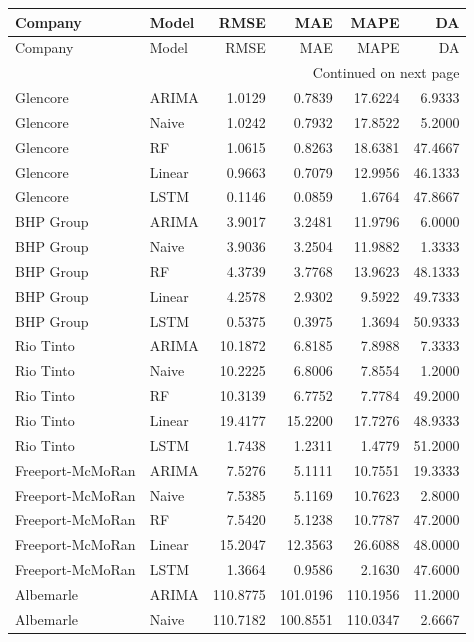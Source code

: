 \begin{longtable}{llrrrr}
\toprule
Company & Model & RMSE & MAE & MAPE & DA \\
\midrule
\endfirsthead
\toprule
Company & Model & RMSE & MAE & MAPE & DA \\
\midrule
\endhead
\midrule
\multicolumn{6}{r}{Continued on next page} \\
\midrule
\endfoot
\bottomrule
\endlastfoot
Glencore & ARIMA & 1.0129 & 0.7839 & 17.6224 & 6.9333 \\
Glencore & Naive & 1.0242 & 0.7932 & 17.8522 & 5.2000 \\
Glencore & RF & 1.0615 & 0.8263 & 18.6381 & 47.4667 \\
Glencore & Linear & 0.9663 & 0.7079 & 12.9956 & 46.1333 \\
Glencore & LSTM & 0.1146 & 0.0859 & 1.6764 & 47.8667 \\
BHP Group & ARIMA & 3.9017 & 3.2481 & 11.9796 & 6.0000 \\
BHP Group & Naive & 3.9036 & 3.2504 & 11.9882 & 1.3333 \\
BHP Group & RF & 4.3739 & 3.7768 & 13.9623 & 48.1333 \\
BHP Group & Linear & 4.2578 & 2.9302 & 9.5922 & 49.7333 \\
BHP Group & LSTM & 0.5375 & 0.3975 & 1.3694 & 50.9333 \\
Rio Tinto & ARIMA & 10.1872 & 6.8185 & 7.8988 & 7.3333 \\
Rio Tinto & Naive & 10.2225 & 6.8006 & 7.8554 & 1.2000 \\
Rio Tinto & RF & 10.3139 & 6.7752 & 7.7784 & 49.2000 \\
Rio Tinto & Linear & 19.4177 & 15.2200 & 17.7276 & 48.9333 \\
Rio Tinto & LSTM & 1.7438 & 1.2311 & 1.4779 & 51.2000 \\
Freeport-McMoRan & ARIMA & 7.5276 & 5.1111 & 10.7551 & 19.3333 \\
Freeport-McMoRan & Naive & 7.5385 & 5.1169 & 10.7623 & 2.8000 \\
Freeport-McMoRan & RF & 7.5420 & 5.1238 & 10.7787 & 47.2000 \\
Freeport-McMoRan & Linear & 15.2047 & 12.3563 & 26.6088 & 48.0000 \\
Freeport-McMoRan & LSTM & 1.3664 & 0.9586 & 2.1630 & 47.6000 \\
Albemarle & ARIMA & 110.8775 & 101.0196 & 110.1956 & 11.2000 \\
Albemarle & Naive & 110.7182 & 100.8551 & 110.0347 & 2.6667 \\

\end{longtable}
